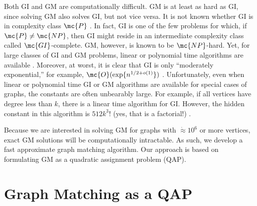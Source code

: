 \documentclass[11pt]{article}
\begin{document}
Both GI and GM are computationally difficult. GM is at least as hard as GI, since solving GM also solves GI, but not vice versa. It is not known whether GI is in complexity class $\mc{P}$ \cite{Fortin1996}.  In fact, GI is one of the few problems for which, if $\mc{P} \neq \mc{NP}$, then GI might reside in an intermediate complexity class called $\mc{GI}$-complete.  GM, however, is known to be $\mc{NP}$-hard.    
Yet, for large classes of GI and GM problems, linear or polynomial time algorithms are available \cite{Babai1980}.  Moreover, at worst, it is clear that GI is only ``moderately exponential,'' for example, $\mc{O}(\exp\{n^{1/2 + o(1)}\})$ \cite{Babai1981}.  Unfortunately, even when linear or polynomial time GI or GM algorithms are available for special cases of graphs, the constants are often unbearably large.  For example, if all vertices have degree less than $k$, there is a linear time algorithm for GI.  However, the hidden constant in this algorithm is $512k^3!$ (yes, that is a factorial!) \cite{Chen1994}.  

Because we are interested in solving GM for graphs with $\dot{\approx} 10^6$ or more vertices, exact GM solutions will be computationally intractable. As such, we develop a fast approximate graph matching algorithm.   Our approach is based on formulating GM as a quadratic assignment problem (QAP).  %



\section{Graph  Matching as a QAP} %
\label{sec:QAP}

% 
\end{document}

